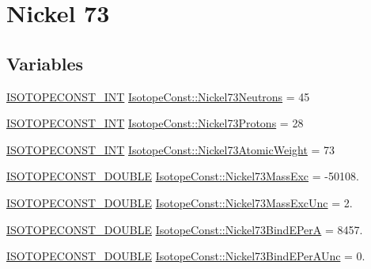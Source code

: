 \hypertarget{group___isotope_const-_nickel-_ni73}{}\section{Nickel 73}
\label{group___isotope_const-_nickel-_ni73}
\subsection*{Variables}
\begin{DoxyCompactItemize}
\item 
\mbox{\hyperlink{group___isotope_const-_macros_ga5f18360b3e99483a35c32d789e62621c}{I\+S\+O\+T\+O\+P\+E\+C\+O\+N\+S\+T\+\_\+\+I\+NT}} \mbox{\hyperlink{group___isotope_const-_nickel-_ni73_ga75bc43f6dbcbb6db7f0f9e1d45ab63c7}{Isotope\+Const\+::\+Nickel73\+Neutrons}} = 45
\item 
\mbox{\hyperlink{group___isotope_const-_macros_ga5f18360b3e99483a35c32d789e62621c}{I\+S\+O\+T\+O\+P\+E\+C\+O\+N\+S\+T\+\_\+\+I\+NT}} \mbox{\hyperlink{group___isotope_const-_nickel-_ni73_gac76f119b03f165e1c965c574359400ac}{Isotope\+Const\+::\+Nickel73\+Protons}} = 28
\item 
\mbox{\hyperlink{group___isotope_const-_macros_ga5f18360b3e99483a35c32d789e62621c}{I\+S\+O\+T\+O\+P\+E\+C\+O\+N\+S\+T\+\_\+\+I\+NT}} \mbox{\hyperlink{group___isotope_const-_nickel-_ni73_gaf72f5c2f417c66d85ecc7282864538e5}{Isotope\+Const\+::\+Nickel73\+Atomic\+Weight}} = 73
\item 
\mbox{\hyperlink{group___isotope_const-_macros_ga8f45a7272ce02c0b4c65c44636ed719a}{I\+S\+O\+T\+O\+P\+E\+C\+O\+N\+S\+T\+\_\+\+D\+O\+U\+B\+LE}} \mbox{\hyperlink{group___isotope_const-_nickel-_ni73_ga268e8a0bdbadd8c88c95c7760cf3ac4e}{Isotope\+Const\+::\+Nickel73\+Mass\+Exc}} = -\/50108.
\item 
\mbox{\hyperlink{group___isotope_const-_macros_ga8f45a7272ce02c0b4c65c44636ed719a}{I\+S\+O\+T\+O\+P\+E\+C\+O\+N\+S\+T\+\_\+\+D\+O\+U\+B\+LE}} \mbox{\hyperlink{group___isotope_const-_nickel-_ni73_gab6a292fe4ba7d22ddb1cf37ff64a3186}{Isotope\+Const\+::\+Nickel73\+Mass\+Exc\+Unc}} = 2.
\item 
\mbox{\hyperlink{group___isotope_const-_macros_ga8f45a7272ce02c0b4c65c44636ed719a}{I\+S\+O\+T\+O\+P\+E\+C\+O\+N\+S\+T\+\_\+\+D\+O\+U\+B\+LE}} \mbox{\hyperlink{group___isotope_const-_nickel-_ni73_ga07a38dd1d6f511372421cb12689a5059}{Isotope\+Const\+::\+Nickel73\+Bind\+E\+PerA}} = 8457.
\item 
\mbox{\hyperlink{group___isotope_const-_macros_ga8f45a7272ce02c0b4c65c44636ed719a}{I\+S\+O\+T\+O\+P\+E\+C\+O\+N\+S\+T\+\_\+\+D\+O\+U\+B\+LE}} \mbox{\hyperlink{group___isotope_const-_nickel-_ni73_ga3d2b26203d6f59946fa780ef2f6d4804}{Isotope\+Const\+::\+Nickel73\+Bind\+E\+Per\+A\+Unc}} = 0.

\end{DoxyCompactItemize}
